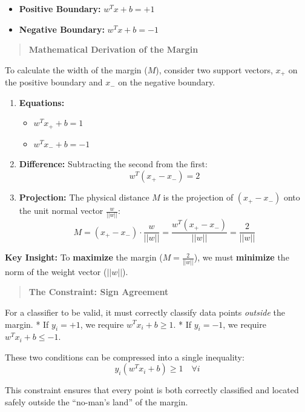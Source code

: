 \documentclass[
  letterpaper,
  DIV=11,
  numbers=noendperiod]{scrreprt}
\providecommand{\tightlist}{%
  \setlength{\itemsep}{0pt}\setlength{\parskip}{0pt}}
\begin{document}
\begin{itemize}
\tightlist
\item
  \textbf{Positive Boundary:} \(w^T x + b = +1\)
\item
  \textbf{Negative Boundary:} \(w^T x + b = -1\)
\end{itemize}

\begin{quote}
\textbf{Mathematical Derivation of the Margin}
\end{quote}

To calculate the width of the margin (\(M\)), consider two support
vectors, \(x_+\) on the positive boundary and \(x_-\) on the negative
boundary.

\begin{enumerate}
\def\labelenumi{\arabic{enumi}.}
\item
  \textbf{Equations:}

  \begin{itemize}
  \tightlist
  \item
    \(w^T x_+ + b = 1\)
  \item
    \(w^T x_- + b = -1\)
  \end{itemize}
\item
  \textbf{Difference:} Subtracting the second from the first:
  \[w^T (x_+ - x_-) = 2\]
\item
  \textbf{Projection:} The physical distance \(M\) is the projection of
  \((x_+ - x_-)\) onto the unit normal vector \(\frac{w}{||w||}\):
  \[M = (x_+ - x_-) \cdot \frac{w}{||w||} = \frac{w^T(x_+ - x_-)}{||w||} = \frac{2}{||w||}\]
\end{enumerate}

\textbf{Key Insight:} To \textbf{maximize} the margin
(\(M = \frac{2}{||w||}\)), we must \textbf{minimize} the norm of the
weight vector (\(||w||\)).

\begin{quote}
\textbf{The Constraint: Sign Agreement}
\end{quote}

For a classifier to be valid, it must correctly classify data points
\emph{outside} the margin. * If \(y_i = +1\), we require
\(w^T x_i + b \ge 1\). * If \(y_i = -1\), we require
\(w^T x_i + b \le -1\).

These two conditions can be compressed into a single inequality:
\[y_i (w^T x_i + b) \ge 1 \quad \forall i\]

This constraint ensures that every point is both correctly classified
and located safely outside the ``no-man's land'' of the margin.
\end{document}
